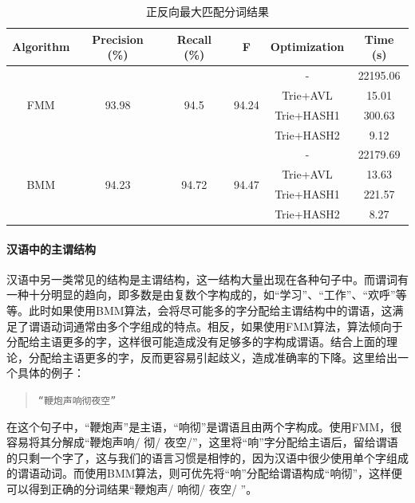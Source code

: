 \documentclass[11pt,a4paper]{article}
\begin{document}
	\begin{table}[h]
		\centering
		\begin{tabular}{cccccc}
			\hline
			\textbf{Algorithm}            & \textbf{Precision (\%)} & \textbf{Recall (\%)}   & \textbf{F}             & \textbf{Optimization} & \textbf{Time (s)} \\ \hline
			\multirow{4}{*}{FMM} & \multirow{4}{*}{93.98}  & \multirow{4}{*}{94.5}  & \multirow{4}{*}{94.24} & -                     & 22195.06          \\
			&                         &                        &                        & Trie+AVL              & 15.01             \\
			&                         &                        &                        & Trie+HASH1            & 300.63            \\
			&                         &                        &                        & Trie+HASH2            & 9.12              \\ \hline
			\multirow{4}{*}{BMM}          & \multirow{4}{*}{94.23}  & \multirow{4}{*}{94.72} & \multirow{4}{*}{94.47} & -                     & 22179.69          \\
			&                         &                        &                        & Trie+AVL              & 13.63             \\
			&                         &                        &                        & Trie+HASH1            & 221.57            \\
			&                         &                        &                        & Trie+HASH2            & 8.27              \\ \hline
		\end{tabular}
		\caption{正反向最大匹配分词结果}
		\label{sxy:t2}
	\end{table}

	\paragraph{汉语中的主谓结构}
	汉语中另一类常见的结构是主谓结构，这一结构大量出现在各种句子中。而谓词有一种十分明显的趋向，即多数是由复数个字构成的，如“学习”、“工作”、“欢呼”等等。此时如果使用BMM算法，会将尽可能多的字分配给主谓结构中的谓语，这满足了谓语动词通常由多个字组成的特点。相反，如果使用FMM算法，算法倾向于分配给主语更多的字，这样很可能造成没有足够多的字构成谓语。结合上面的理论，分配给主语更多的字，反而更容易引起歧义，造成准确率的下降。这里给出一个具体的例子：
	\begin{quote}
		\verb|“鞭炮声响彻夜空”|\\
	\end{quote}
	在这个句子中，“鞭炮声”是主语，“响彻”是谓语且由两个字构成。使用FMM，很容易将其分解成“鞭炮声响/ 彻/ 夜空/”，这里将“响”字分配给主语后，留给谓语的只剩一个字了，这与我们的语言习惯是相悖的，因为汉语中很少使用单个字组成的谓语动词。而使用BMM算法，则可优先将“响”分配给谓语构成“响彻”，这样便可以得到正确的分词结果“鞭炮声/ 响彻/ 夜空/ ”。
	
\end{document}
